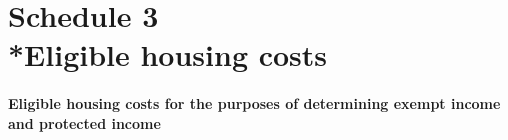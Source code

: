 \documentclass[12pt,a4paper]{article}
\begin{document}

\part[Schedule 3 --- Eligible housing costs]{Schedule 3\\*Eligible housing costs}

\renewcommand\parthead{--- Schedule 3}

\subsection*{Eligible housing costs for the purposes of determining exempt income and protected income}
\end{document}
